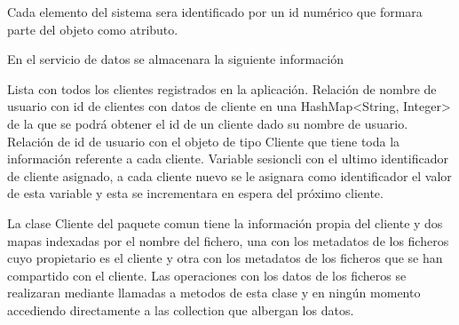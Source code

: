 Cada elemento del sistema sera identificado por un id numérico que formara parte del objeto como atributo.

En el servicio de datos se almacenara la siguiente información

Lista con todos los clientes registrados en la aplicación.
Relación de nombre de usuario con id de clientes con datos de cliente en una HashMap<String, Integer> de la que se podrá obtener el id de un cliente dado su nombre de usuario.
Relación de id de usuario con el objeto de tipo Cliente que tiene toda la información referente a cada cliente.
Variable sesioncli con el ultimo identificador de cliente asignado, a cada cliente nuevo se le asignara como identificador el valor de esta variable y esta se incrementara en espera del próximo cliente.

La clase Cliente del paquete comun tiene la información propia del cliente y dos mapas indexadas por el nombre del fichero, una con los metadatos de los ficheros cuyo propietario es el cliente y otra con los metadatos de los ficheros que se han compartido con el cliente. Las operaciones con los datos de los ficheros se realizaran mediante llamadas a metodos de esta clase y en ningún momento accediendo directamente a las collection que albergan los datos.
